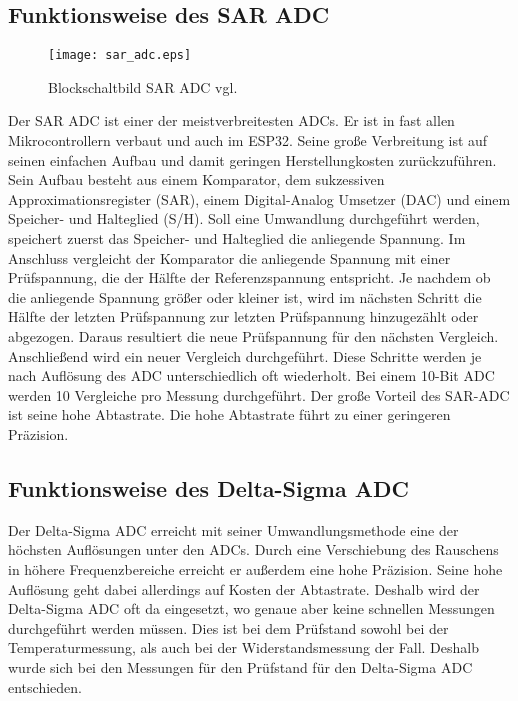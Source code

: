 \subsection{Funktionsweise des SAR ADC}
\begin{figure}[h]
\centering
\texttt{[image: sar\_adc.eps]}
\caption{Blockschaltbild SAR ADC vgl. \cite{Kester2005}}
\end{figure}
\noindent
Der SAR ADC ist einer der meistverbreitesten ADCs. Er ist in fast allen Mikrocontrollern verbaut und auch im ESP32. Seine große Verbreitung ist auf seinen einfachen Aufbau und damit geringen Herstellungkosten zurückzuführen.
\cite{Kester2005}
\\
Sein Aufbau besteht aus einem Komparator, dem sukzessiven Approximationsregister (SAR), einem Digital-Analog Umsetzer (DAC) und einem Speicher- und Halteglied (S/H).
\cite[][S. 29]{Ohnhaeuser2015}
Soll eine Umwandlung durchgeführt werden, speichert zuerst das Speicher- und Halteglied die anliegende Spannung. Im Anschluss vergleicht der Komparator die anliegende Spannung mit einer Prüfspannung, die der Hälfte der Referenzspannung entspricht. Je nachdem ob die anliegende Spannung größer oder kleiner ist, wird im nächsten Schritt die Hälfte der letzten Prüfspannung zur letzten Prüfspannung hinzugezählt oder abgezogen. Daraus resultiert die neue Prüfspannung für den nächsten Vergleich. Anschließend wird ein neuer Vergleich durchgeführt. Diese Schritte werden je nach Auflösung des ADC unterschiedlich oft wiederholt. Bei einem 10-Bit ADC werden 10 Vergleiche pro Messung durchgeführt.
\cite[][S. 29]{Ohnhaeuser2015}
Der große Vorteil des SAR-ADC ist seine hohe Abtastrate. Die hohe Abtastrate führt zu einer geringeren Präzision.

\subsection{Funktionsweise des Delta-Sigma ADC}
Der Delta-Sigma ADC erreicht mit seiner Umwandlungsmethode eine der höchsten Auflösungen unter den ADCs\cite[][S. 31]{Ohnhaeuser2015}. Durch eine Verschiebung des Rauschens in höhere Frequenzbereiche erreicht er außerdem eine hohe Präzision. Seine hohe Auflösung geht dabei allerdings auf Kosten der Abtastrate. Deshalb wird der Delta-Sigma ADC oft da eingesetzt, wo genaue aber keine schnellen Messungen durchgeführt werden müssen. Dies ist bei dem Prüfstand sowohl bei der Temperaturmessung, als auch bei der Widerstandsmessung der Fall. Deshalb wurde sich bei den Messungen für den Prüfstand für den Delta-Sigma ADC entschieden.
\cite{Baker2011_1}

